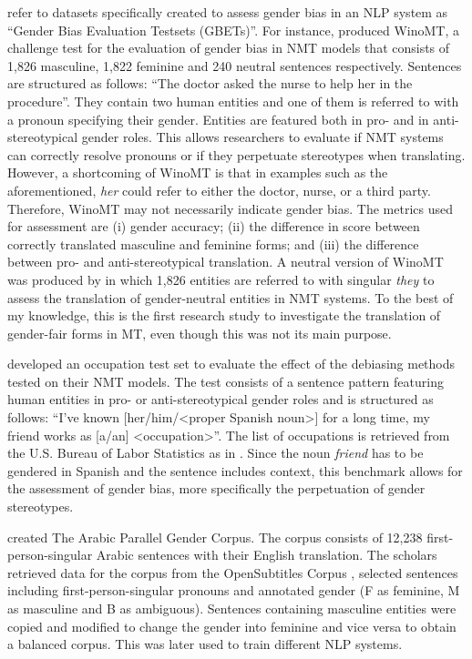 \textcite[1632f]{sun2019mitigating} refer to datasets specifically created to assess gender bias in an NLP system as ``Gender Bias Evaluation Testsets (GBETs)''. For instance, \textcite{stanovsky2019evaluating} produced WinoMT, a challenge test for the evaluation of gender bias in NMT models that consists of 1,826 masculine, 1,822 feminine and 240 neutral sentences respectively. Sentences are structured as follows: ``The doctor asked the nurse to help her in the procedure''. They contain two human entities and one of them is referred to with a pronoun specifying their gender. Entities are featured both in pro- and in anti-stereotypical gender roles. This allows researchers to evaluate if NMT systems can correctly resolve pronouns or if they perpetuate stereotypes when translating. However, a shortcoming of WinoMT is that  in examples such as the aforementioned, \textit{her} could refer to either the doctor, nurse, or a third party. Therefore, WinoMT may not necessarily indicate gender bias. The metrics used for assessment are (i) gender accuracy; (ii) the difference in score between correctly translated masculine and feminine forms; and (iii) the difference between pro- and anti-stereotypical translation. A neutral version of WinoMT was produced by \textcite{saunders2020neural} in which 1,826 entities are referred to with singular \textit{they} to assess the translation of gender-neutral entities in NMT systems. To the best of my knowledge, this is the first research study to investigate the translation of gender-fair forms in MT, even though this was not its main purpose. 

\textcite{font2019equalizing} developed an occupation test set to evaluate the effect of the debiasing methods tested on their NMT models. %
The test consists of a sentence pattern featuring human entities in pro- or anti-stereotypical gender roles and is structured as follows: ``I’ve known [her/him/<proper Spanish noun>] for a long time, my friend works as [a/an] <occupation>''. The list of occupations is retrieved from the U.S. Bureau of Labor Statistics as in \textcite{prates2019assessing}. Since the noun \textit{friend} has to be gendered in Spanish and the sentence includes context, this benchmark allows for the assessment of gender bias, more specifically the perpetuation of gender stereotypes.

\textcite{habash-etal-2019-automatic} created The Arabic Parallel Gender Corpus. The corpus consists of 12,238 first-person-singular Arabic sentences with their English translation. The scholars retrieved data for the corpus from the OpenSubtitles Corpus \citep{lison-tiedemann-2016-opensubtitles2016}, selected sentences including first-person-singular pronouns and annotated gender (F as feminine, M as masculine and B as ambiguous). Sentences containing masculine entities were copied and modified to change the gender into feminine and vice versa to obtain a balanced corpus. This was later used to train different NLP systems.

